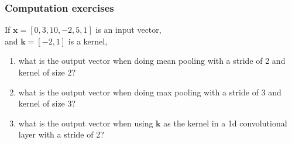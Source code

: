 \documentclass{beamer}
\begin{document}
\begin{frame}
  \frametitle{Computation exercises}
  If $\mathbf x = [0, 3, 10, -2, 5, 1]$ is an input vector,\\
  and $\mathbf k = [-2, 1]$ is a kernel,\\
  \begin{enumerate}
  \item what is the output vector when doing mean pooling with a
    stride of 2 and kernel of size 2?
  \item what is the output vector when doing max pooling with a stride
    of 3 and kernel of size 3?
  \item what is the output vector when using $\mathbf k$ as the kernel
    in a 1d convolutional layer with a stride of 2?
  \end{enumerate}
\end{frame}
\end{document}

